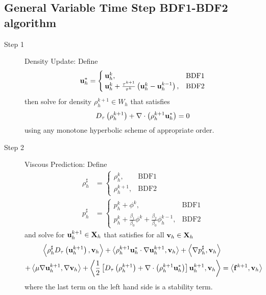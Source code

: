 \documentclass[letterpaper]{erdc}
\begin{document}
%
%  
\subsection{General Variable Time Step BDF1-BDF2 algorithm}\label{sec:generalalgorithmdescription}

\begin{description}
\item[Step 1] Density Update: Define
\begin{equation}
  \textbf{u}_h^{*} = \begin{cases}
                \textbf{u}_h^{k}, & \mbox{BDF1} \\
                \textbf{u}_h^{k} + \frac{\tau^{k+1}}{\tau^k}\left( \textbf{u}_h^{k} - \textbf{u}_h^{k-1}\right), & \mbox{BDF2} 
               \end{cases}
 \end{equation}
then solve for density $\rho_h^{k+1}\in W_h$ that satisfies
\begin{equation}\label{eqn:generaldensity}
D_{\tau}\left(\rho_h^{k+1}\right) + \nabla\cdot\left( \rho_h^{k+1}\textbf{u}_h^{*} \right) = 0
\end{equation}
using any monotone hyperbolic scheme of appropriate order. 

\item[Step 2] Viscous Prediction: Define
\begin{align}
  \rho_h^{\sharp} &= \begin{cases}
                       \rho_h^{k}, & \mbox{BDF1} \\
                       \rho_h^{k+1}, & \mbox{BDF2} 
                      \end{cases}\\
  p_h^{\sharp} &= \begin{cases}
                  p_h^{k} + \phi^{k}, & \mbox{BDF1}\\ 
                  p_h^{k} + \frac{\beta_1}{\beta_0}\phi^{k} + \frac{\beta_2}{\beta_0}\phi_h^{k-1}, & \mbox{BDF2} 
                 \end{cases}
\end{align}
and solve for $\textbf{u}_h^{k+1}\in\textbf{X}_h$ that satisfies for all $\textbf{v}_h\in\textbf{X}_h$
\begin{equation}\label{eqn:generalvelocity}
  \begin{split}
    \left\langle \rho_h^{\sharp}D_{\tau}\left(\textbf{u}_h^{k+1}\right), \textbf{v}_h \right\rangle  + \left\langle \rho_h^{k+1}\textbf{u}_h^{*}\cdot\nabla\textbf{u}_h^{k+1}, \textbf{v}_h \right\rangle +\left\langle \nabla p_h^{\sharp}, \textbf{v}_h \right\rangle &\\
     + \left\langle \mu\nabla\textbf{u}_h^{k+1}, \nabla\textbf{v}_h \right\rangle  + \left\langle \frac{1}{2}\left[ D_{\tau}\left(\rho_h^{k+1}\right) + \nabla\cdot\left( \rho_h^{k+1}\textbf{u}_h^{*} \right)\right] \textbf{u}_h^{k+1}, \textbf{v}_h \right\rangle &= \left\langle \mathbf{f}^{k+1}, \textbf{v}_h \right\rangle
  \end{split}
\end{equation}
where the last term on the left hand side is a stability term.  


\end{description}
\end{document}
